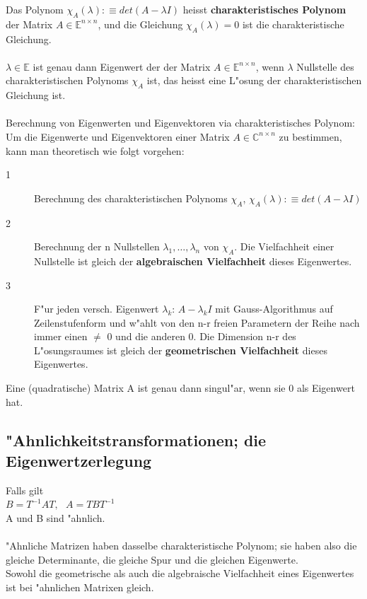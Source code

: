 \documentclass[10pt, a4paper, twocolumn]{scrartcl}
\begin{document}
Das Polynom $\chi_A(\lambda):\equiv det(A-\lambda I)$ heisst {\bf charakteristisches Polynom} der Matrix $A \in \mathbb{E}^{n\times n}$, und die Gleichung $\chi_A(\lambda)=0$ ist die charakteristische Gleichung.\\\\

$\lambda \in \mathbb{E}$ ist genau dann Eigenwert der der Matrix $A \in \mathbb{E}^{n\times n}$, wenn $\lambda$ Nullstelle des charakteristischen Polynoms $\chi_A$ ist, das heisst eine L"osung der charakteristischen Gleichung ist.\\\\

Berechnung von Eigenwerten und Eigenvektoren via charakteristisches Polynom:\\
Um die Eigenwerte und Eigenvektoren einer Matrix $A \in \mathbb{C}^{n\times n}$ zu bestimmen, kann man theoretisch wie folgt vorgehen:
\begin{description}
 \item[1] Berechnung des charakteristischen Polynoms $\chi_A$,
 $\chi_A(\lambda):\equiv det(A-\lambda I)$
 \item[2] Berechnung der n Nullstellen $\lambda_1,\ldots ,\lambda_n$ von $\chi_A$. Die Vielfachheit einer Nullstelle ist gleich der {\bf algebraischen Vielfachheit} dieses Eigenwertes.
 \item[3] F"ur jeden versch. Eigenwert $\lambda_k$: $A-\lambda_k I$ mit Gauss-Algorithmus auf Zeilenstufenform und w"ahlt von den n-r freien Parametern der Reihe nach immer einen $\neq$ 0 und die anderen 0. Die Dimension n-r des L"osungsraumes ist gleich der {\bf geometrischen Vielfachheit} dieses Eigenwertes.
\end{description}

Eine (quadratische) Matrix A ist genau dann singul"ar, wenn sie 0 als Eigenwert hat.

\subsection{"Ahnlichkeitstransformationen; die Eigenwertzerlegung}

Falls gilt\\
$B=T^{-1}AT,\:\:\:A=TBT^{-1}$\\
A und B sind "ahnlich.\\\\

"Ahnliche Matrizen haben dasselbe charakteristische Polynom; sie haben also die gleiche Determinante, die gleiche Spur und die gleichen Eigenwerte.\\
Sowohl die geometrische als auch die algebraische Vielfachheit eines Eigenwertes ist bei "ahnlichen Matrixen gleich.\\\\
\end{document}
